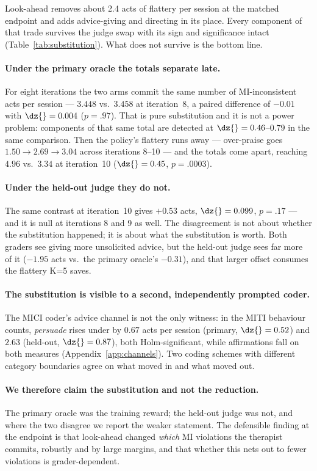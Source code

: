 Look-ahead removes about 2.4 acts of flattery per session at the matched endpoint and adds
advice-giving and directing in its place. Every component of that trade survives the judge swap
with its sign and significance intact (Table~\ref{tab:substitution}). What does not survive is the
bottom line.

\paragraph{Under the primary oracle the totals separate late.} For eight iterations the two arms
commit the same number of MI-inconsistent acts per session --- $3.448$ vs.\ $3.458$ at iteration~8,
a paired difference of $-0.01$ with $\dz{}=0.004$ ($p{=}.97$). That is pure substitution and it is
not a power problem: components of that same total are detected at $\dz{}=0.46$--$0.79$ in the same
comparison. Then the \Kz{} policy's flattery runs away --- over-praise goes $1.50 \to 2.69 \to
3.04$ across iterations 8--10 --- and the totals come apart, reaching $4.96$ vs.\ $3.34$ at
iteration~10 ($\dz{}=0.45$, $p{=}.0003$).

\paragraph{Under the held-out judge they do not.} The same contrast at iteration~10 gives
$+0.53$ acts, $\dz{}=0.099$, $p{=}.17$ --- and it is null at iterations 8 and 9 as well. The
disagreement is not about whether the substitution happened; it is about what the substitution is
worth. Both graders see \Kf{} giving more unsolicited advice, but the held-out judge sees far more
of it ($-1.95$ acts vs.\ the primary oracle's $-0.31$), and that larger offset consumes the
flattery K=5 saves.

\paragraph{The substitution is visible to a second, independently prompted coder.} The MICI
coder's advice channel is not the only witness: in the MITI behaviour counts, \emph{persuade}
rises under \Kf{} by $0.67$ acts per session (primary, $\dz{}=0.52$) and $2.63$ (held-out,
$\dz{}=0.87$), both Holm-significant, while affirmations fall on both measures
(Appendix~\ref{app:channels}). Two coding schemes with different category boundaries agree on
what moved in and what moved out.

\paragraph{We therefore claim the substitution and not the reduction.} The primary oracle was the
training reward; the held-out judge was not, and where the two disagree we report the weaker
statement. The defensible finding at the endpoint is that look-ahead changed \emph{which} MI
violations the therapist commits, robustly and by large margins, and that whether this nets out to
fewer violations is grader-dependent.

